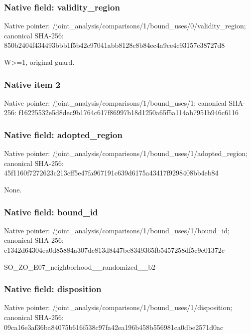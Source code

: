 \documentclass[10pt,a4paper]{article}
\begin{document}
\subsubsection{Native field: validity\_\allowbreak{}region}
Native pointer: /joint\_\allowbreak{}analysis/comparisons/1/bound\_\allowbreak{}uses/0/validity\_\allowbreak{}region; canonical SHA-256: 850b2404f434493bbb1f5b42c97041abb8128c8b84ec4a9ce4c93157c38727d8

\begingroup\raggedright\sloppy W>=\allowbreak{}1,\allowbreak{} original guard.\par\endgroup

\subsubsection{Native item 2}
Native pointer: /joint\_\allowbreak{}analysis/comparisons/1/bound\_\allowbreak{}uses/1; canonical SHA-256: f16225532e5d8dec9b1764c617f86997b18d1250a65f5a114ab7951b946c6116

\subsubsection{Native field: adopted\_\allowbreak{}region}
Native pointer: /joint\_\allowbreak{}analysis/comparisons/1/bound\_\allowbreak{}uses/1/adopted\_\allowbreak{}region; canonical SHA-256: 45f1160f7272623c213cff5e47fa967191c639d6175a43417f9298408bb4eb84

\begingroup\raggedright\sloppy None.\par\endgroup

\subsubsection{Native field: bound\_\allowbreak{}id}
Native pointer: /joint\_\allowbreak{}analysis/comparisons/1/bound\_\allowbreak{}uses/1/bound\_\allowbreak{}id; canonical SHA-256: e1342d64304ea0d85884a307dc813d8447bc8349365fb5457258df5c9c01372c

\begingroup\raggedright\sloppy SO\_\allowbreak{}ZO\_\allowbreak{}E07\_\allowbreak{}neighborhood\_\allowbreak{}\_\allowbreak{}randomized\_\allowbreak{}\_\allowbreak{}b2\par\endgroup

\subsubsection{Native field: disposition}
Native pointer: /joint\_\allowbreak{}analysis/comparisons/1/bound\_\allowbreak{}uses/1/disposition; canonical SHA-256: 09ca16e3af36ba84075b616f538c97fa42ea196b458b556981ca0dbe2571d0ac
\end{document}
